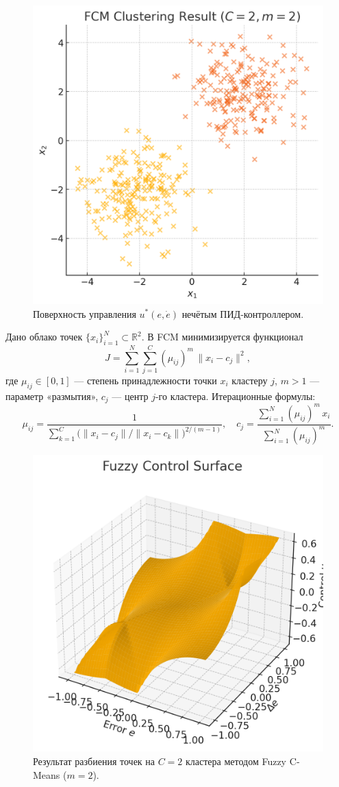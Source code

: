 \begin{figure}[ht]
  \centering
  \includegraphics[width=0.7\linewidth]{images/fuzzy_surface.png}
  \caption{Поверхность управления $u^*(e,\dot e)$ нечётым ПИД‐контроллером.}
  \label{fig:fuzzy-surface}
\end{figure}

\begin{example}
Дано облако точек $\{x_i\}_{i=1}^N\subset\mathbb{R}^2$. В FCM минимизируется функционал
\[
  J = \sum_{i=1}^N \sum_{j=1}^C (\mu_{ij})^m \,\|x_i - c_j\|^2,
\]
где $\mu_{ij}\in[0,1]$ — степень принадлежности точки $x_i$ кластеру $j$, $m>1$ — параметр «размытия», $c_j$ — центр $j$-го кластера.  
Итерационные формулы:
\[
  \mu_{ij}
    = \frac{1}{\sum_{k=1}^C \bigl(\|x_i-c_j\|/\|x_i-c_k\|\bigr)^{2/(m-1)}}, 
  \quad
  c_j
    = \frac{\sum_{i=1}^N (\mu_{ij})^m\,x_i}{\sum_{i=1}^N (\mu_{ij})^m}.
\]
\end{example}

\begin{figure}[ht]
  \centering
  \includegraphics[width=0.7\linewidth]{images/fcm_clusters.png}
  \caption{Результат разбиения точек на $C=2$ кластера методом Fuzzy C‐Means ($m=2$).}
  \label{fig:fcm-clusters}
\end{figure}

